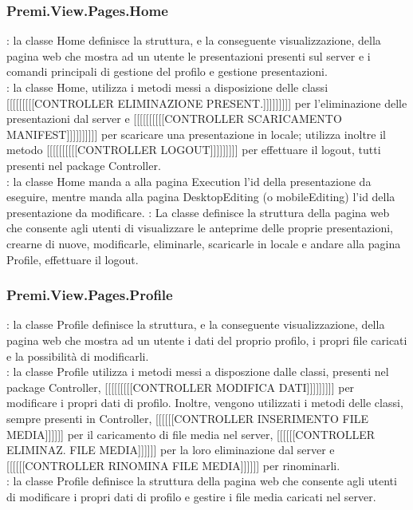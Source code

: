 {		\subsubsection{Premi.View.Pages.Home}{
			\textbf{\tipo}: la classe Home definisce la struttura, e la conseguente visualizzazione, della pagina web che mostra ad un utente le presentazioni presenti sul server e i comandi principali di gestione del profilo e gestione presentazioni.\\	
			\textbf{\relaz}: la classe Home, utilizza i metodi messi a disposizione delle classi [[[[[[[[[CONTROLLER ELIMINAZIONE PRESENT.]]]]]]]]] per l'eliminazione delle presentazioni dal server e [[[[[[[[[[CONTROLLER SCARICAMENTO MANIFEST]]]]]]]]]] per scaricare una presentazione in locale; utilizza inoltre il metodo [[[[[[[[[[CONTROLLER LOGOUT]]]]]]]]] per effettuare il logout, tutti presenti nel package Controller.\\
			\textbf{\interfacce}: la classe Home manda a alla pagina Execution l'id della presentazione da eseguire, mentre manda alla pagina DesktopEditing (o mobileEditing) l'id della presentazione da modificare.
			\textbf{\attivita}: La classe definisce la struttura della pagina web che consente agli utenti di visualizzare le anteprime delle proprie presentazioni, crearne di nuove, modificarle, eliminarle, scaricarle in locale e andare alla pagina Profile, effettuare il logout.\\
		}
		\subsubsection{Premi.View.Pages.Profile}{
			\textbf{\tipo}: la classe Profile definisce la struttura, e la conseguente visualizzazione, della pagina web che mostra ad un utente i dati del proprio profilo, i propri file caricati e la possibilità di modificarli. \\
			\textbf{\relaz}: la classe Profile utilizza i metodi messi a disposzione dalle classi, presenti nel package Controller, [[[[[[[[[CONTROLLER MODIFICA DATI]]]]]]]]] per modificare i propri dati di profilo. Inoltre, vengono utilizzati i metodi delle classi, sempre presenti in Controller, [[[[[[CONTROLLER INSERIMENTO FILE MEDIA]]]]]] per il caricamento di file media nel server, [[[[[[CONTROLLER ELIMINAZ. FILE MEDIA]]]]]] per la loro eliminazione dal server e [[[[[[CONTROLLER RINOMINA FILE MEDIA]]]]]] per rinominarli.\\
			\textbf{\attivita}: la classe Profile definisce la struttura della pagina web che consente agli utenti di modificare i propri dati di profilo e gestire i file media caricati nel server.\\
		}
}
